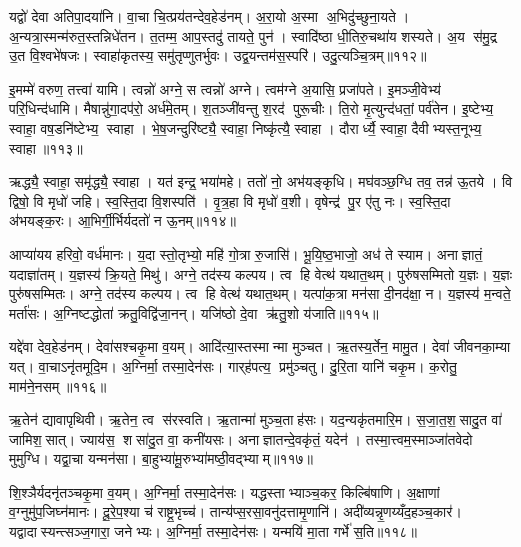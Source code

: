 यद्वो॑ देवा अतिपा॒दया॑नि। वा॒चा चि॒त्प्रय॑तन्देव॒हेड॑नम्। अ॒रा॒यो अ॒स्मा अ॒भिदु॑च्छुना॒यते। अ॒न्यत्रा॒स्मन्म॑रुत॒स्तन्निधे॑तन। त॒तम्म॒ आप॒स्तदु॑ तायते॒ पुन॑। स्वादि॑ष्ठा धी॒तिरु॒चथा॑य शस्यते। अ॒य स॑मु॒द्र उ॒त वि॒श्वभे॑षजः। स्वाहा॑कृतस्य॒ समु॑तृप्णुतर्भुवः। उद्व॒यन्तम॑स॒स्परि॑। उदु॒त्यञ्चि॒त्रम्॥११२॥

इ॒मम्मे॑ वरुण॒ तत्त्वा॑ यामि। त्वन्नो॑ अग्ने॒ स त्वन्नो॑ अग्ने। त्वम॑ग्ने अ॒यासि॒ प्रजा॑पते। इ॒मञ्जी॒वेभ्य॑ परि॒धिन्द॑धामि। मैषान्नु॑गा॒दप॑रो॒ अर्ध॑मे॒तम्। श॒तञ्जी॑वन्तु श॒रद॑ पुरू॒चीः। ति॒रो मृ॒त्युन्द॑धतां॒ पर्व॑तेन। इ॒ष्टेभ्य॒ स्वाहा॒ वष॒डनि॑ष्टेभ्य॒ स्वाहा। भे॒ष॒जन्दुरि॑ष्ट्यै॒ स्वाहा॒ निष्कृ॑त्यै॒ स्वाहा। दौरार्ध्यै॒ स्वाहा॒ दैवीभ्यस्त॒नूभ्य॒ स्वाहा॥११३॥

ऋद्ध्यै॒ स्वाहा॒ समृ॑द्ध्यै॒ स्वाहा। यत॑ इन्द्र॒ भया॑महे। ततो॑ नो॒ अभ॑यङ्कृधि। मघ॑वञ्छ॒ग्धि तव॒ तन्न॑ ऊ॒तये। वि द्विषो॒ वि मृधो॑ जहि। स्व॒स्ति॒दा वि॒शस्पति॑। वृ॒त्र॒हा वि मृधो॑ व॒शी। वृषेन्द्र॑ पु॒र ए॑तु नः। स्व॒स्ति॒दा अ॑भयङ्क॒रः। आ॒भिर्गी॒र्भिर्यदतो॑ न ऊ॒नम्॥११४॥

आप्या॑यय हरिवो॒ वर्ध॑मानः। य॒दा स्तो॒तृभ्यो॒ महि॑ गो॒त्रा रु॒जासि॑। भू॒यि॒ष्ठ॒भाजो॒ अध॑ ते स्याम। अनाज्ञातं॒ यदाज्ञा॑तम्। य॒ज्ञस्य॑ क्रि॒यते॒ मिथु॑। अग्ने॒ तद॑स्य कल्पय। त्व हि वेत्थ॑ यथात॒थम्। पुरु॑षसम्मितो य॒ज्ञः। य॒ज्ञः पुरु॑षसम्मितः। अग्ने॒ तद॑स्य कल्पय। त्व हि वेत्थ॑ यथात॒थम्। यत्पा॑क॒त्रा मन॑सा दी॒नद॑क्षा॒ न। य॒ज्ञस्य॑ म॒न्वते॒ मर्ता॑सः। अ॒ग्निष्टद्धोता॑ क्रतु॒विद्वि॑जा॒नन्। यजि॑ष्ठो दे॒वा ऋ॑तु॒शो य॑जाति॥११५॥\anuvakamend[दे॒वा श्चि॒त्रं त॒नूभ्य॒ स्वाहो॒नं पुरु॑षसम्मि॒तोऽग्ने॒ तद॑स्य कल्पय॒ पञ्च॑ च]

यद्दे॑वा देव॒हेड॑नम्। देवा॑सश्चकृ॒मा व॒यम्। आदि॑त्या॒स्तस्मान्मा मुञ्चत। ऋ॒तस्य॒र्तेन॒ मामु॒त। देवा॑ जीवनका॒म्या यत्। वा॒चाऽनृ॑तमूदि॒म। अ॒ग्निर्मा॒ तस्मा॒देन॑सः। गार्‌ह॑पत्य॒ प्रमु॑ञ्चतु। दु॒रि॒ता यानि॑ चकृ॒म। क॒रोतु॒ माम॑ने॒नसम्॥११६॥

ऋ॒तेन॑ द्यावापृथिवी। ऋ॒तेन॒ त्व स॑रस्वति। ऋ॒तान्मा॑ मुञ्च॒ताह॑सः। यद॒न्यकृ॑तमारि॒म। स॒जा॒त॒श॒सादु॒त वा॑ जामिश॒सात्। ज्याय॑स॒ शसा॑दु॒त वा॒ कनी॑यसः। अनाज्ञातन्दे॒वकृ॑तं॒ यदेन॑। तस्मा॒त्त्वम॒स्माञ्जा॑तवेदो मुमुग्धि। यद्वा॒चा यन्मन॑सा। बा॒हुभ्या॑मू॒रुभ्या॑मष्ठी॒वद्भ्याम्॥११७॥

शि॒श्ञैर्यदनृ॑तञ्चकृ॒मा व॒यम्। अ॒ग्निर्मा॒ तस्मा॒देन॑सः। यद्धस्ताभ्याञ्च॒कर॒ किल्बि॑षाणि। अ॒क्षाणां व॒ग्नुमु॑प॒जिघ्न॑मानः। दू॒रे॒प॒श्या च॑ राष्ट्र॒भृच्च॑। तान्य॑प्स॒रसा॒वनु॑दत्तामृ॒णानि॑। अदी॑व्यन्नृ॒णय्यँद॒हञ्च॒कार॑। यद्वादास्यन्त्सञ्ज॒गारा॒ जनेभ्यः। अ॒ग्निर्मा॒ तस्मा॒देन॑सः। यन्मयि॑ मा॒ता गर्भे॑ स॒ति॥११८॥

